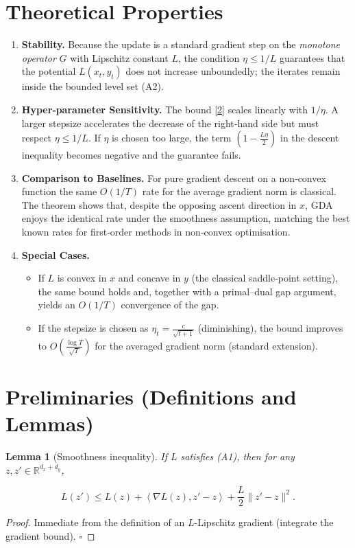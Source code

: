 \documentclass{article}
\newtheorem{lemma}{Lemma}
\newcommand{\inner}[2]{\left\langle #1,#2 \right\rangle}
\begin{document}
\section*{Theoretical Properties}
\begin{enumerate}[label=\textbf{P\arabic*:}, leftmargin=*]
\item \textbf{Stability.}  
Because the update is a standard gradient step on the \emph{monotone operator} \(G\) with Lipschitz constant \(L\), the condition \(\eta\le 1/L\) guarantees that the potential \(L(x_t,y_t)\) does not increase unboundedly; the iterates remain inside the bounded level set (A2).

\item \textbf{Hyper‑parameter Sensitivity.}  
The bound \eqref{2} scales linearly with \(1/\eta\).  A larger stepsize accelerates the decrease of the right‑hand side but must respect \(\eta\le 1/L\).  If \(\eta\) is chosen too large, the term \((1-\tfrac{L\eta}{2})\) in the descent inequality becomes negative and the guarantee fails.

\item \textbf{Comparison to Baselines.}  
For pure gradient descent on a non‑convex function the same \(O(1/T)\) rate for the average gradient norm is classical.  The theorem shows that, despite the opposing ascent direction in \(x\), GDA enjoys the identical rate under the smoothness assumption, matching the best known rates for first‑order methods in non‑convex optimisation.

\item \textbf{Special Cases.}
\begin{itemize}
\item If \(L\) is convex in \(x\) and concave in \(y\) (the classical saddle‑point setting), the same bound holds and, together with a primal–dual gap argument, yields an \(O(1/T)\) convergence of the gap.
\item If the stepsize is chosen as \(\eta_t = \frac{c}{\sqrt{t+1}}\) (diminishing), the bound improves to \(O(\frac{\log T}{\sqrt{T}})\) for the averaged gradient norm (standard extension).
\end{itemize}
\end{enumerate}

\section*{Preliminaries (Definitions and Lemmas)}
\begin{lemma}[Smoothness inequality]\label{lem:smooth}
If \(L\) satisfies (A1), then for any \(z,z'\in\mathbb R^{d_x+d_y}\),

\[
L(z')\le L(z)+\inner{\nabla L(z)}{z'-z}+\frac{L}{2}\|z'-z\|^{2}.
\tag{3}
\]
\end{lemma}
\begin{proof}
Immediate from the definition of an \(L\)-Lipschitz gradient (integrate the gradient bound). \hfill\(\square\)
\end{proof}
\end{document}
